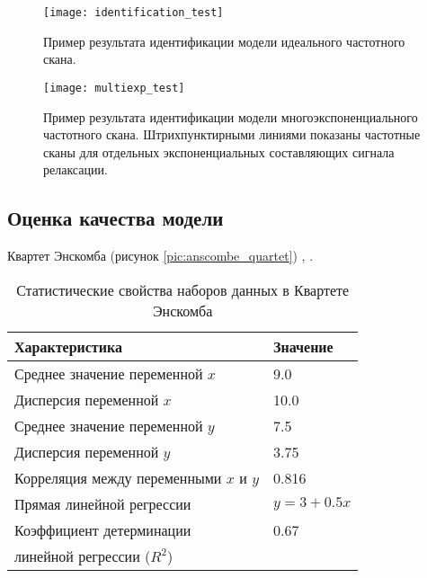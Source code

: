     \begin{figure}[!htp]
        \centering
        \texttt{[image: identification\_test]}
        \caption{Пример результата идентификации модели идеального частотного 
        скана.}
        \label{pic:identification_test}
    \end{figure}


    \begin{figure}[!htp]
        \centering
        \texttt{[image: multiexp\_test]}
        \caption{Пример результата идентификации модели многоэкспоненциального
        частотного скана. Штрихпунктирными линиями показаны частотные сканы для
        отдельных экспоненциальных составляющих сигнала релаксации.}
        \label{pic:multiexp_test}
    \end{figure}


    \subsection{Оценка качества модели}
    Квартет Энскомба (рисунок \ref{pic:anscombe_quartet}) 
    \cite{anscombe_quartet_wikipedia}, \cite{anscombe_quartet_article}.

    \begin{table}[!htp]
    	\centering
    	\caption{Статистические свойства наборов данных в Квартете Энскомба}
		\begin{tabular}{|l|l|}
			\hline
			Характеристика                         & Значение   \\ \hline
			Среднее значение переменной $x$        & 9.0        \\ \hline
			Дисперсия переменной $x$               & 10.0       \\ \hline
			Среднее значение переменной $y$        & 7.5        \\ \hline
			Дисперсия переменной $y$               & 3.75       \\ \hline
			Корреляция между переменными $x$ и $y$ & 0.816      \\ \hline
			Прямая линейной регрессии              & $y=3+0.5x$ \\ \hline
			Коэффициент детерминации               & 0.67       \\
			линейной регрессии ($R^2$)             &            \\ \hline
		\end{tabular}
		\label{table:anscombe_quartet_statistics}
	\end{table}

